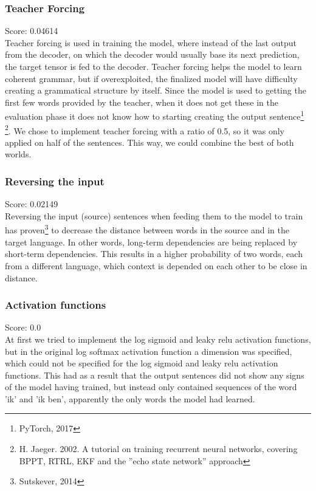 \documentclass[11pt]{article}
\begin{document}
\subsubsection*{Teacher Forcing}
Score: 0.04614
\\Teacher forcing is used in training the model, where instead of the last output from the decoder, on which the decoder would usually base its next prediction, the target tensor is fed to the decoder. Teacher forcing helps the model to learn coherent grammar, but if overexploited, the finalized model will have difficulty creating a grammatical structure by itself. Since the model is used to getting the first few words provided by the teacher, when it does not get these in the evaluation phase it does not know how to starting creating the output sentence\footnote[8]{PyTorch, 2017} \footnote[9]{ H. Jaeger. 2002. A tutorial on training recurrent neural networks, covering BPPT, RTRL, EKF and the ”echo state network” approach}. We chose to implement teacher forcing with a ratio of 0.5, so it was only applied on half of the sentences. This way, we could combine the best of both worlds.

\subsubsection*{Reversing the input}
Score: 0.02149
\\Reversing the input (source) sentences when feeding them to the model to train has proven\footnote[10]{Sutskever, 2014} to decrease the distance between words in the source and in the target language. In other words, long-term dependencies are being replaced by short-term dependencies. This results in a higher probability of two words, each from a different language, which context is depended on each other to be close in distance.

\subsubsection*{Activation functions}
Score: 0.0
\\At first we tried to implement the log sigmoid and leaky relu activation functions, but in the original log softmax activation function a dimension was specified, which could not be specified for the log sigmoid and leaky relu activation functions. This had as a result that the output sentences did not show any signs of the model having trained, but instead only contained sequences of the word 'ik' and 'ik ben', apparently the only words the model had learned.
\end{document}
